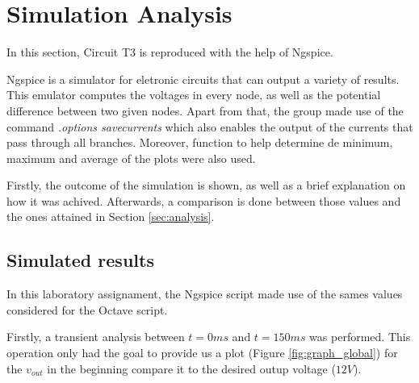 
\section{Simulation Analysis}
\label{sec:simulation}



In this section, Circuit T3 is reproduced with the help of Ngspice.

Ngspice is a simulator for eletronic circuits that can output a variety of results.
This emulator computes the voltages in every node, as well as the potential difference
between two given nodes. Apart from that, the group made use of the command
{\em .options savecurrents} which also enables the output of the currents that pass
through all branches. Moreover, function to help determine de minimum, maximum and average
of the plots were also used.


Firstly, the outcome of the simulation is shown, as well as a brief explanation
on how it was achived. Afterwards, a comparison is done between those values and
the ones attained in Section \ref{sec:analysis}.




\subsection{Simulated results}
\label{subsec:sim_res}




In this laboratory assignament, the Ngspice script made use of the sames values considered for
the Octave script.

Firstly, a transient analysis between $t=0ms$ and $t=150ms$ was performed. This operation
only had the goal to provide us a plot (Figure \ref{fig:graph_global}) for the
$v_{out}$ in the beginning compare it to the desired outup voltage ($12V$).

